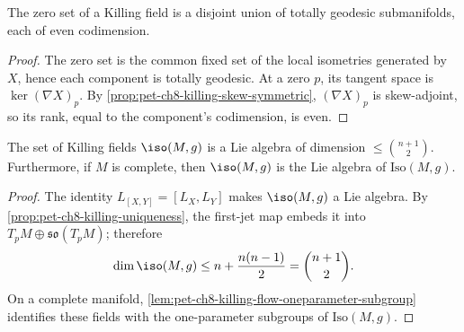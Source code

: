 \begin{theorem}
  \label{thm:pet-ch8-zero-set-totally-geodesic}
  The zero set of a Killing field is a disjoint union of totally geodesic
  submanifolds, each of even codimension.
\end{theorem}
\begin{proof}
  \sketch
  The zero set is the common fixed set of the local isometries generated by
  \(X\), hence each component is totally geodesic. At a zero \(p\), its tangent
  space is \(\ker(\nabla X)_p\). By
  \cref{prop:pet-ch8-killing-skew-symmetric}, \((\nabla X)_p\) is
  skew-adjoint, so its rank, equal to the component's codimension, is even.
\end{proof}

\begin{theorem}
  \label{thm:pet-ch8-isometry-lie-algebra-dimension}
  The set of Killing fields $\iso(M,g)$ is a Lie algebra of dimension
  $\le\binom{n+1}{2}$. Furthermore, if $M$ is complete, then $\iso(M,g)$ is the
  Lie algebra of $\mathrm{Iso}(M,g)$.
\end{theorem}
\begin{proof}
  \sketch
  The identity \(L_{[X,Y]}=[L_X,L_Y]\) makes \(\iso(M,g)\) a Lie algebra.
  By \cref{prop:pet-ch8-killing-uniqueness}, the first-jet map embeds it into
  \(T_pM\oplus\mathfrak{so}(T_pM)\); therefore
  \[
    \dim\iso(M,g)\le n+\frac{n(n-1)}2=\binom{n+1}{2}.
  \]
  On a complete manifold, \cref{lem:pet-ch8-killing-flow-oneparameter-subgroup}
  identifies these fields with the one-parameter subgroups of
  \(\mathrm{Iso}(M,g)\).
\end{proof}

